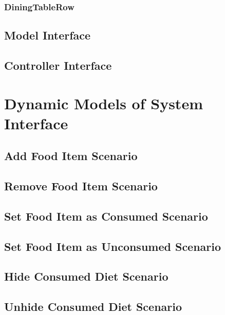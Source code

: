 \documentclass{scrreprt}
\begin{document}
\subsubsection{DiningTableRow}
\subsection{Model Interface}
\subsection{Controller Interface}
\section{Dynamic Models of System Interface}
\subsection{Add Food Item Scenario}
\subsection{Remove Food Item Scenario}
\subsection{Set Food Item as Consumed Scenario}
\subsection{Set Food Item as Unconsumed Scenario}
\subsection{Hide Consumed Diet Scenario}
\subsection{Unhide Consumed Diet Scenario}
\end{document}
